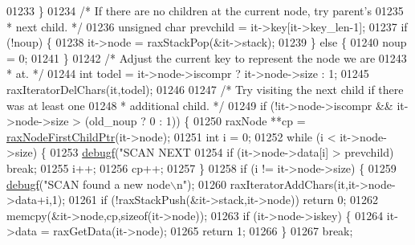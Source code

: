 \begin{DoxyCode}
{{{{{{{{{{{{{{{{{{01233                 \}
01234                 \textcolor{comment}{/* If there are no children at the current node, try parent's}
01235 \textcolor{comment}{                 * next child. */}
01236                 \textcolor{keywordtype}{unsigned} \textcolor{keywordtype}{char} prevchild = it->key[it->key\_len-1];
01237                 \textcolor{keywordflow}{if} (!noup) \{
01238                     it->node = raxStackPop(&it->stack);
01239                 \} \textcolor{keywordflow}{else} \{
01240                     noup = 0;
01241                 \}
01242                 \textcolor{comment}{/* Adjust the current key to represent the node we are}
01243 \textcolor{comment}{                 * at. */}
01244                 \textcolor{keywordtype}{int} todel = it->node->iscompr ? it->node->size : 1;
01245                 raxIteratorDelChars(it,todel);
01246 
01247                 \textcolor{comment}{/* Try visiting the next child if there was at least one}
01248 \textcolor{comment}{                 * additional child. */}
01249                 \textcolor{keywordflow}{if} (!it->node->iscompr && it->node->size > (old\_noup ? 0 : 1)) \{
01250                     raxNode **cp = \hyperlink{rax_8c_aa94163a0d02b30219ef18e5a3ea06ca6}{raxNodeFirstChildPtr}(it->node);
01251                     \textcolor{keywordtype}{int} i = 0;
01252                     \textcolor{keywordflow}{while} (i < it->node->size) \{
01253                         \hyperlink{rax_8c_a10b215c81aa397dbc44adfb3e436befb}{debugf}(\textcolor{stringliteral}{"SCAN NEXT %
01254                         \textcolor{keywordflow}{if} (it->node->data[i] > prevchild) \textcolor{keywordflow}{break};
01255                         i++;
01256                         cp++;
01257                     \}
01258                     \textcolor{keywordflow}{if} (i != it->node->size) \{
01259                         \hyperlink{rax_8c_a10b215c81aa397dbc44adfb3e436befb}{debugf}(\textcolor{stringliteral}{"SCAN found a new node\(\backslash\)n"});
01260                         raxIteratorAddChars(it,it->node->data+i,1);
01261                         \textcolor{keywordflow}{if} (!raxStackPush(&it->stack,it->node)) \textcolor{keywordflow}{return} 0;
01262                         memcpy(&it->node,cp,\textcolor{keyword}{sizeof}(it->node));
01263                         \textcolor{keywordflow}{if} (it->node->iskey) \{
01264                             it->data = raxGetData(it->node);
01265                             \textcolor{keywordflow}{return} 1;
01266                         \}
01267                         \textcolor{keywordflow}{break};
}}}}}}}}}}}}}}}}}}}
\end{DoxyCode}
